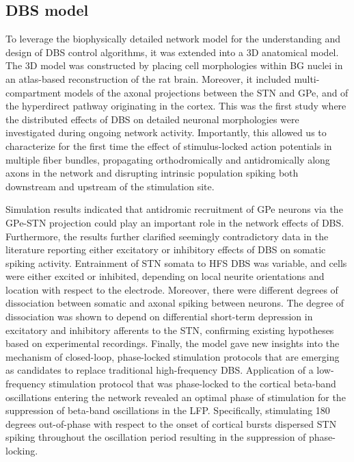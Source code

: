 \subsection{DBS model}
%
%
%
%
%
To leverage the biophysically detailed network model for the understanding
and design of DBS control algorithms, it was extended into a 3D anatomical
model. The 3D model was constructed by placing cell morphologies within
BG nuclei in an atlas-based reconstruction of the rat brain. Moreover,
it included multi-compartment models of the axonal projections between
the STN and GPe, and of the hyperdirect pathway originating in the cortex.
This was the first study where the distributed effects of DBS on
detailed neuronal morphologies were investigated during ongoing network
activity. Importantly, this allowed us to characterize for the first time the
effect of stimulus-locked action potentials in multiple fiber bundles,
propagating orthodromically and antidromically along axons in the network
and disrupting intrinsic population spiking both downstream and upstream
of the stimulation site.
%
%
%
%

%
%
%
%
%
Simulation results indicated that antidromic recruitment of GPe neurons
via the GPe-STN projection could play an important role in the network
effects of DBS. Furthermore, the results further clarified seemingly contradictory
data in the literature reporting either excitatory or inhibitory effects
of DBS on somatic spiking activity. Entrainment of STN somata to HFS DBS
was variable, and cells were either excited or inhibited, depending on
local neurite orientations and location with respect to the electrode. Moreover, there
were different degrees of dissociation between somatic and axonal spiking
between neurons. The degree of dissociation was shown to
depend on differential short-term depression in excitatory and inhibitory
afferents to the STN, confirming existing hypotheses based on experimental
recordings. Finally, the model gave new insights into the mechanism
of closed-loop, phase-locked stimulation protocols that are
emerging as candidates to replace traditional high-frequency DBS.
Application of a low-frequency stimulation protocol that was phase-locked to the
cortical beta-band oscillations entering the network revealed an optimal
phase of stimulation for the suppression of beta-band oscillations in the LFP.
Specifically, stimulating 180 degrees out-of-phase with respect to the
onset of cortical bursts dispersed STN spiking throughout the oscillation
period resulting in the suppression of phase-locking.

